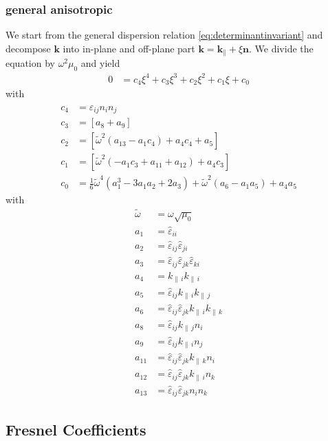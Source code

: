 \documentclass[12pt,a4paper,twoside,openright,BCOR10mm,headsepline,titlepage,abstracton,chapterprefix,final]{scrreprt}
\newcommand\Vector[1]{{\mathbf{#1}}}
\newcommand\vacuum{0}
\newcommand\wavenumber{k}
\newcommand\Wavevector{\Vector{\wavenumber}}
\newcommand\Tensor[1]{\hat{#1}}
\newcommand\vacuumpermeability{\scalarpermeability_{\vacuum}}
\newcommand\scalarpermeability{\mu}
\newcommand\permittivity{\Tensor{\scalarpermittivity}}
\newcommand\scalarpermittivity{\varepsilon}
\newcommand{\kpa}[1]{{\wavenumber_{\parallel\,#1}}}
\begin{document}
\subsubsection{general anisotropic}
We start from the general dispersion relation \eqref{eq:determinantinvariant} and decompose $\Wavevector$ into in-plane and off-plane part
$\Wavevector = \Wavevector_\parallel + \xi \Vector{n}$.
We divide the equation by $\omega^2 \vacuumpermeability$ and yield
\begin{align}
0 &= c_4 \xi ^4 + c_3 \xi ^3 + c_2 \xi ^2 + c_1 \xi + c_0
\end{align}
with
\begin{align}
 c_4 &= \permittivity_{ij} n_i n_j \\
 c_3 &= \left[a_8+a_9\right] \\
 c_2 &= \left[\tilde{\omega} ^2 (a_{13}-a_1 c_4)+ a_4 c_4+a_5\right] \\
 c_1 &= \left[\tilde{\omega}^2 (-a_1 c_3 + a_{11}+a_{12})+a_4 c_3\right] \\
 c_0 &= \frac{1}{6} \tilde{\omega} ^4 \left(a_1^3-3 a_1 a_2+2 a_3\right) +\tilde{\omega}^2 (a_6-a_1 a_5)+a_4 a_5
\end{align}
with
\begin{subequations}
\begin{align}
\tilde{\omega} &= \omega \sqrt{\mu_0}\\
 a_1 &= \permittivity_{ii} \\
 a_2 &= \permittivity_{ij}\permittivity_{ji} \\ 
 a_3 &= \permittivity_{ij}\permittivity_{jk}\permittivity_{ki} \\
 a_4 &= \kpa{i}\kpa{i} \\
 a_5 &= \permittivity_{ij} \kpa{i} \kpa{j} \\
 a_6 &= \permittivity_{ij} \permittivity_{jk} \kpa{i}\kpa{k} \\
 a_8 &= \permittivity_{ij} \kpa{j} n_i \\
 a_9 &= \permittivity_{ij} \kpa{i} n_j \\
 a_{11} &= \permittivity_{ij} \permittivity_{jk} \kpa{k} n_i \\
 a_{12} &= \permittivity_{ij} \permittivity_{jk} \kpa{i} n_k \\
 a_{13} &= \permittivity_{ij} \permittivity_{jk} n_i n_k 
\end{align}
\end{subequations}



\subsection{Fresnel Coefficients}
\end{document}
